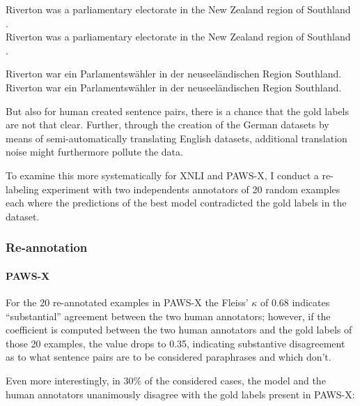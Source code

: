 \begin{examples}
  \item Riverton was a parliamentary electorate in the New Zealand region of Southland .\\
        Riverton was a parliamentary electorate in the New Zealand region of Southland .

  \item Riverton war ein Parlamentswähler in der neuseeländischen Region Southland.\\
        Riverton war ein Parlamentswähler in der neuseeländischen Region Southland.
\end{examples}

But also for human created sentence pairs, there
is a chance that the gold labels are not that clear. Further, through the creation of the German
datasets by means of semi-automatically translating English datasets, additional translation
noise might furthermore pollute the data.

To examine this more systematically for XNLI and PAWS-X, I conduct a re-labeling experiment with
two independents annotators of 20 random examples each where the predictions of the best model
contradicted the gold labels in the dataset.


\subsubsection{Re-annotation}

\paragraph*{PAWS-X}

For the 20 re-annotated examples in PAWS-X the Fleiss' $\kappa$ of 0.68 indicates ``substantial'' agreement
between the two human annotators; however, if the coefficient is computed between the two human annotators
and the gold labels of those 20 examples, the value drops to 0.35, indicating substantive disagreement
as to what sentence pairs are to be considered paraphrases and which don't.

Even more interestingly, in 30\% of the considered cases, the model and the human annotators unanimously
disagree with the gold labels present in PAWS-X:


